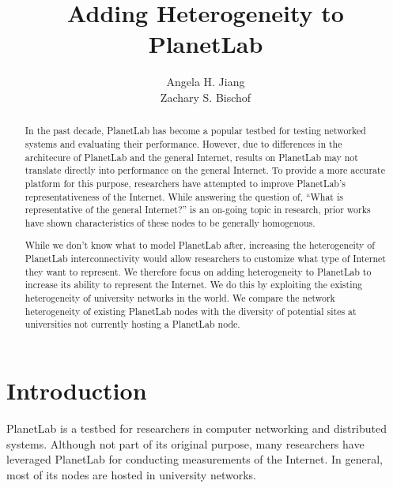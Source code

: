 \documentclass{sig-alternate-10pt}
\begin{document}
\title{Adding Heterogeneity to PlanetLab}

\author{
\alignauthor
Angela H. Jiang\\
\alignauthor
Zachary S. Bischof\\
}


\maketitle
\begin{abstract}

In the past decade, PlanetLab has become a popular testbed for testing
networked systems and evaluating their performance. However, due to differences
in the architecure of PlanetLab and the general Internet, results on PlanetLab
may not translate directly into performance on the general Internet.  To
provide a more accurate platform for this purpose, researchers have attempted
to improve PlanetLab's representativeness of the Internet. While answering the
question of, ``What is representative of the general Internet?'' is an on-going
topic in research, prior works have shown characteristics of these nodes to be
generally homogenous. 


While we don't know what to model PlanetLab after, increasing the heterogeneity
of PlanetLab interconnectivity would allow researchers to customize what type
of Internet they want to represent.  We therefore focus on adding heterogeneity
to PlanetLab to increase its ability to represent the Internet.  We do this by
exploiting the existing heterogeneity of university networks in the world. We
compare the network heterogeneity of existing PlanetLab nodes with the
diversity of potential sites at universities not currently hosting a PlanetLab
node.

\end{abstract}

\section{Introduction}

PlanetLab is a testbed for researchers in computer networking and distributed
systems. Although not part of its original purpose, many researchers have
leveraged PlanetLab for conducting measurements of the Internet.  In general,
most of its nodes are hosted in university networks.\cite{banerjee:connectivity}
\end{document}
